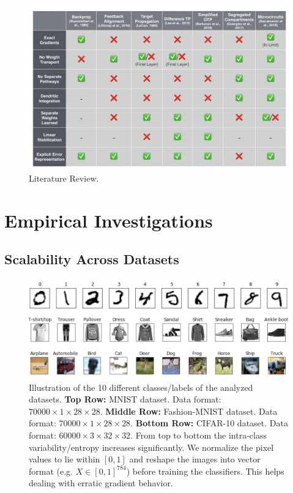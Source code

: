 \documentclass[colorinlistoftodos]{article}
\theoremstyle{definition}
\begin{document}
\begin{figure}[H]
	\centering
	\includegraphics[width=\textwidth]{../figures/report/lit_rev}
	\caption{Literature Review.}	
\end{figure}

\newpage
\section{Empirical Investigations}

\subsection*{Scalability Across Datasets}

\begin{figure}[H]
	\centering
	\includegraphics[width=\textwidth]{../figures/report/datasets}
	\caption{Illustration of the 10 different classes/labels of the analyzed datasets. \textbf{Top Row:} MNIST dataset. Data format: $70000 \times 1 \times 28 \times 28$. \textbf{Middle Row:} Fashion-MNIST dataset. Data format: $70000 \times 1 \times 28 \times 28$. \textbf{Bottom Row:} CIFAR-10 dataset. Data format: $60000 \times 3 \times 32 \times 32$. From top to bottom the intra-class variability/entropy increases significantly. We normalize the pixel values to lie within $[0, 1]$ and reshape the images into vector format (e.g. $X \in [0, 1]^{784}$) before training the classifiers. This helps dealing with erratic gradient behavior.}	
\end{figure}
\end{document}
